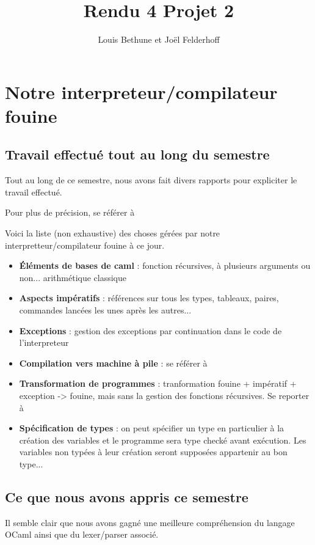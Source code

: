 \documentclass[a4paper,10pt]{report}
\title{Rendu 4 Projet 2}
\author{Louis Bethune et Jo\"el Felderhoff}
\date{}
\begin{document}
\maketitle

\section{Notre interpreteur/compilateur fouine}

\subsection{Travail effectué tout au long du semestre}
Tout au long de ce semestre, nous avons fait divers rapports pour expliciter le travail effectué.

Pour plus de précision, se référer à \cite{Rapport1} \cite{Rapport2}

Voici la liste (non exhaustive) des choses gérées par notre interpretteur/compilateur fouine à ce jour.

\begin{itemize}
\item \textbf{Éléments de bases de caml} : fonction récursives, à plusieurs arguments ou non... arithmétique classique
\item \textbf{Aspects impératifs} : références sur tous les types, tableaux, paires, commandes lancées les unes après les autres...
\item \textbf{Exceptions} : gestion des exceptions par continuation dans le code de l'interpreteur
\item \textbf{Compilation vers machine à pile} : se référer à \cite{Rapport1}
\item \textbf{Transformation de programmes} : tranformation fouine + impératif + exception -> fouine, mais sans la gestion des fonctions récursives. Se reporter à \cite{Rapport2}
\item \textbf{Spécification de types} : on peut spécifier un type en particulier à la création des variables et le programme sera type checké avant exécution. Les variables non typées à leur création seront supposées appartenir au bon type...
\end{itemize}

\subsection{Ce que nous avons appris ce semestre}
Il semble clair que nous avons gagné une meilleure compréhension du langage OCaml ainsi que du lexer/parser associé.
\end{document}
